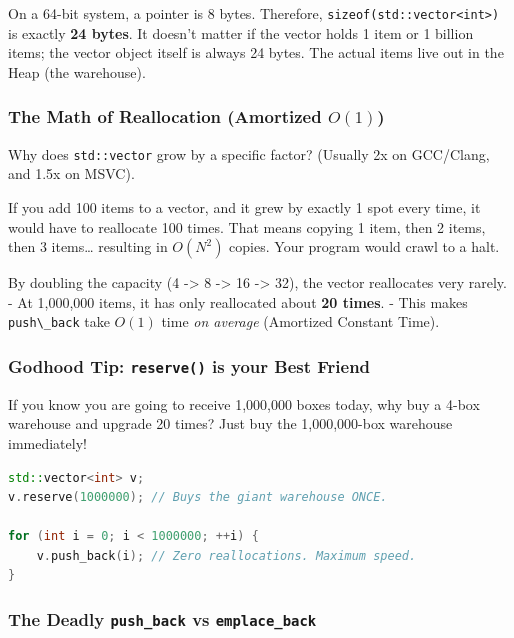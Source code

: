 On a 64-bit system, a pointer is 8 bytes. Therefore,
\passthrough{\lstinline!sizeof(std::vector<int>)!} is exactly \textbf{24
bytes}. It doesn't matter if the vector holds 1 item or 1 billion items;
the vector object itself is always 24 bytes. The actual items live out
in the Heap (the warehouse).

\hypertarget{the-math-of-reallocation-amortized-o1}{%
\subsubsection{\texorpdfstring{The Math of Reallocation (Amortized
\(O(1)\))}{The Math of Reallocation (Amortized O(1))}}\label{the-math-of-reallocation-amortized-o1}}

Why does \passthrough{\lstinline!std::vector!} grow by a specific
factor? (Usually 2x on GCC/Clang, and 1.5x on MSVC).

If you add 100 items to a vector, and it grew by exactly 1 spot every
time, it would have to reallocate 100 times. That means copying 1 item,
then 2 items, then 3 items\ldots{} resulting in \(O(N^2)\) copies. Your
program would crawl to a halt.

By doubling the capacity (4 -\textgreater{} 8 -\textgreater{} 16
-\textgreater{} 32), the vector reallocates very rarely. - At 1,000,000
items, it has only reallocated about \textbf{20 times}. - This makes
\passthrough{\lstinline!push\_back!} take \(O(1)\) time \emph{on
average} (Amortized Constant Time).

\hypertarget{godhood-tip-reserve-is-your-best-friend}{%
\subsubsection{\texorpdfstring{Godhood Tip: \texttt{reserve()} is your
Best
Friend}{Godhood Tip: reserve() is your Best Friend}}\label{godhood-tip-reserve-is-your-best-friend}}

If you know you are going to receive 1,000,000 boxes today, why buy a
4-box warehouse and upgrade 20 times? Just buy the 1,000,000-box
warehouse immediately!

\begin{lstlisting}[language={C++}]
std::vector<int> v;
v.reserve(1000000); // Buys the giant warehouse ONCE.

for (int i = 0; i < 1000000; ++i) {
    v.push_back(i); // Zero reallocations. Maximum speed.
}
\end{lstlisting}

\hypertarget{the-deadly-push_back-vs-emplace_back}{%
\subsubsection{\texorpdfstring{The Deadly \texttt{push\_back} vs
\texttt{emplace\_back}}{The Deadly push\_back vs emplace\_back}}\label{the-deadly-push_back-vs-emplace_back}}

